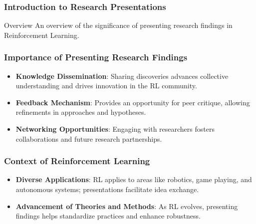 \documentclass[aspectratio=169]{beamer}
\begin{document}
\frame{\titlepage}

\begin{frame}[fragile]
    \frametitle{Introduction to Research Presentations}
    \begin{block}{Overview}
        An overview of the significance of presenting research findings in Reinforcement Learning.
    \end{block}
\end{frame}

\begin{frame}[fragile]
    \frametitle{Importance of Presenting Research Findings}
    \begin{itemize}
        \item \textbf{Knowledge Dissemination}: Sharing discoveries advances collective understanding and drives innovation in the RL community.
        \item \textbf{Feedback Mechanism}: Provides an opportunity for peer critique, allowing refinements in approaches and hypotheses.
        \item \textbf{Networking Opportunities}: Engaging with researchers fosters collaborations and future research partnerships.
    \end{itemize}
\end{frame}

\begin{frame}[fragile]
    \frametitle{Context of Reinforcement Learning}
    \begin{itemize}
        \item \textbf{Diverse Applications}: RL applies to areas like robotics, game playing, and autonomous systems; presentations facilitate idea exchange.
        \item \textbf{Advancement of Theories and Methods}: As RL evolves, presenting findings helps standardize practices and enhance robustness.
    \end{itemize}
\end{frame}
\end{document}
